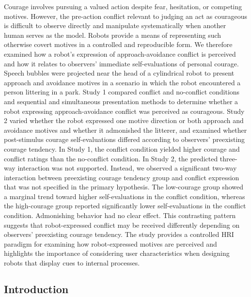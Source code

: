 \documentclass[
]{article}
\begin{document}
Courage involves pursuing a valued action despite fear, hesitation, or
competing motives. However, the pre-action conflict relevant to judging
an act as courageous is difficult to observe directly and manipulate
systematically when another human serves as the model. Robots provide a
means of representing such otherwise covert motives in a controlled and
reproducible form. We therefore examined how a robot's expression of
approach-avoidance conflict is perceived and how it relates to
observers' immediate self-evaluations of personal courage. Speech
bubbles were projected near the head of a cylindrical robot to present
approach and avoidance motives in a scenario in which the robot
encountered a person littering in a park. Study 1 compared conflict and
no-conflict conditions and sequential and simultaneous presentation
methods to determine whether a robot expressing approach-avoidance
conflict was perceived as courageous. Study 2 varied whether the robot
expressed one motive direction or both approach and avoidance motives
and whether it admonished the litterer, and examined whether
post-stimulus courage self-evaluations differed according to observers'
preexisting courage tendency. In Study 1, the conflict condition yielded
higher courage and conflict ratings than the no-conflict condition. In
Study 2, the predicted three-way interaction was not supported. Instead,
we observed a significant two-way interaction between preexisting
courage tendency group and conflict expression that was not specified in
the primary hypothesis. The low-courage group showed a marginal trend
toward higher self-evaluations in the conflict condition, whereas the
high-courage group reported significantly lower self-evaluations in the
conflict condition. Admonishing behavior had no clear effect. This
contrasting pattern suggests that robot-expressed conflict may be
received differently depending on observers' preexisting courage
tendency. The study provides a controlled HRI paradigm for examining how
robot-expressed motives are perceived and highlights the importance of
considering user characteristics when designing robots that display cues
to internal processes.

\subsection{Introduction}\label{introduction}
\end{document}
